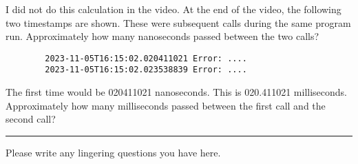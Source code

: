 \documentclass[letterpaper,12pt]{exam}
\begin{document}
\begin{questions}
\begin{samepage}
    \question I did not do this calculation in the video.  At the end of the video, the following two timestamps are shown.  These were subsequent calls during the same program run.  Approximately how many nanoseconds passed between the two calls?
    \begin{verbatim}
        2023-11-05T16:15:02.020411021 Error: ....
        2023-11-05T16:15:02.023538839 Error: ....
    \end{verbatim}
        
    The first time would be 020411021 nanoseconds.  This is 020.411021 milliseconds.
    Approximately how many milliseconds passed between the first call and the second call?
\end{samepage}
\vspace{30mm}


\begin{center}
    \rule{0.5\textwidth}{.4pt}
\end{center}
Please write any lingering questions you have here.
\end{questions}
\end{document}
